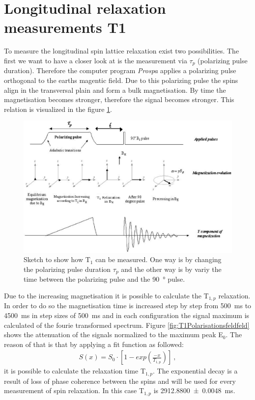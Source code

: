 \section{Longitudinal relaxation measurements T1}
\label{sec:LongitudinalrelaxationmeasurementsT1}
To measure the longitudinal spin lattice relaxation exist two possibilities. The first we want to have a closer look at is the measurement via $\tau_p$ (polarizing pulse duration). Therefore the computer program \textit{Prospa} applies a polarizing pulse orthogonal to the earths magentic field. Due to this polarizing pulse the spins align in the transversal plain and form a bulk magnetisation. By time the magnetisation becomes stronger, therefore the signal becomes stronger. This relation is visualized in the figure \ref{fig:BildT1}.

\begin{figure}[H]
    \centering
    \includegraphics[width= \textwidth]{BildT1.png}   
    \caption[Sketch to show how T$_1$ can be measured. \cite{Bild}]{Sketch to show how T$_1$ can be measured. One way is by changing the polarizing pulse duration $\tau_p$ and the other way is by variy the time between the polarizing pulse and the \SI{90}{\degree} pulse. \cite{Bild}}
    \label{fig:BildT1}
\end{figure}

Due to the increasing magnetisation it is possible to calculate the T$_{1,p}$ relaxation. In order to do so the magnetisation time is increased step by step from \SI{500}{\milli \second} to \SI{4500}{\milli \second} in step sizes of \SI{500}{\milli \second} and in each configuration the signal maximum is calculated of the fourie transformed spectrum. Figure \ref{fig:T1Polarisationsfeldfeld} shows the attenuation of the signals normalized to the maximum peak E$_0$. The reason of that is that by applying a fit function as followed:
\begin{align}
    S(x)=S_0 \cdot [1-exp(\frac{-x}{T_{1,p}})] \ ,
    \label{eq: fitBp}
\end{align}
it is possible to calculate the relaxation time T$_{1,p}$. The exponential decay is a result of loss of phase coherence between the spins and will be used for every measurement of spin relaxation. In this case T$_{1,p}$ is \SI{2912.8800 \pm 0.0048}{\milli \second}.

